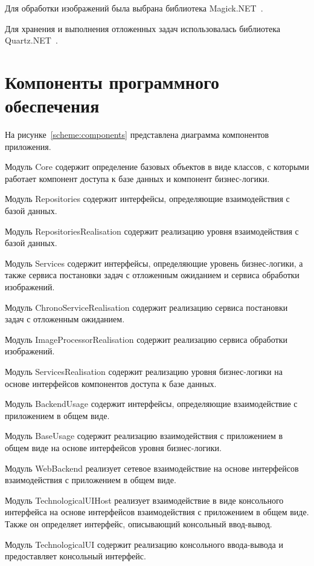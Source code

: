 
Для обработки изображений была выбрана библиотека Magick.NET~\cite{magicknet}. 

Для хранения и выполнения отложенных задач использовалась библиотека Quartz.NET~\cite{quartznet}.

\section{Компоненты программного обеспечения}
На рисунке~\ref{scheme:components} представлена диаграмма компонентов приложения.

Модуль Core содержит определение базовых объектов в виде классов, с которыми работает компонент доступа к базе данных и компонент бизнес-логики.

Модуль Repositories содержит интерфейсы, определяющие взаимодействия с базой данных. 

Модуль RepositoriesRealisation содержит реализацию уровня взаимодействия с базой данных. 

Модуль Services содержит интерфейсы, определяющие уровень бизнес-логики, а также сервиса постановки задач с отложенным ожиданием и сервиса обработки изображений.

Модуль ChronoServiceRealisation содержит реализацию сервиса постановки задач с отложенным ожиданием.

Модуль ImageProcessorRealisation содержит реализацию сервиса обработки изображений.

Модуль ServicesRealisation содержит реализацию уровня бизнес-логики на основе интерфейсов компонентов доступа к базе данных.

Модуль BackendUsage содержит интерфейсы, определяющие взаимодействие с приложением в общем виде.

Модуль BaseUsage содержит реализацию взаимодействия с приложением в общем виде на основе интерфейсов уровня бизнес-логики.

Модуль WebBackend реализует сетевое взаимодействие на основе интерфейсов взаимодействия с приложением в общем виде.

Модуль TechnologicalUIHost реализует взаимодействие в виде консольного интерфейса на основе интерфейсов взаимодействия с приложением в общем виде. Также он определяет интерфейс, описывающий консольный ввод-вывод.

Модуль TechnologicalUI содержит реализацию консольного ввода-вывода и предоставляет  консольный интерфейс.

